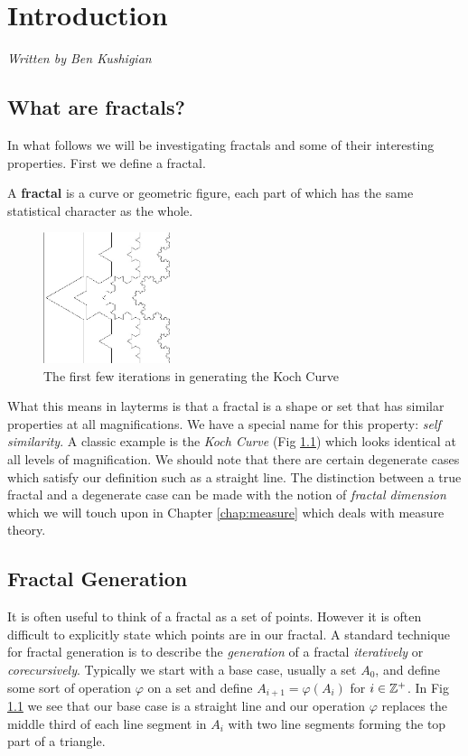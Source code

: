 \chapter{Introduction}
\label{chap:intro}
{\em Written by Ben Kushigian}
\section{What are fractals?}
In what follows we will be investigating fractals and some of their interesting
properties. First we define a fractal.

\begin{dfn}
  A {\bf fractal} is a curve or geometric figure, each part of
  which has the same statistical character as the whole.
\end{dfn}

\begin{figure}
  \centering
  \includegraphics[width=0.33\textwidth]{img/bk_introkochgen}
  \caption{The first few iterations in generating the Koch Curve}
  \label{fig:intro koch}
\end{figure}
What this means in layterms is that a fractal is a shape or set that has
similar properties at all magnifications. We have a special name for this
property: {\em self similarity}. A classic example is the
{\em Koch Curve} (Fig \ref{fig:intro koch}) which looks identical at all levels
of magnification. We should note that there are certain degenerate cases which
satisfy our definition such as a straight line. The distinction between a true
fractal and a degenerate case can be made with the notion of {\em fractal
dimension} which we will touch upon in Chapter \ref{chap:measure} which deals
with measure theory.\\

\section{Fractal Generation}
\label{sec:fractal generation}
It is often useful to think of a fractal as a set of points. However it is
often difficult to explicitly state which points are in our fractal. A standard
technique for fractal generation is to describe the {\em generation} of a 
fractal {\em iteratively} or {\em corecursively}. Typically we start with a
base case, usually a set \(A_0\), and define some sort of operation \(\varphi\)
on a set and define \(A_{i+1} = \varphi(A_i)\) for \(i \in \mathbb Z^+\). In
Fig \ref{fig:intro koch} we see that our base case is a straight line and our
operation \(\varphi\) replaces the middle third of each line segment in \(A_i\)
with two line segments forming the top part of a triangle.\\

